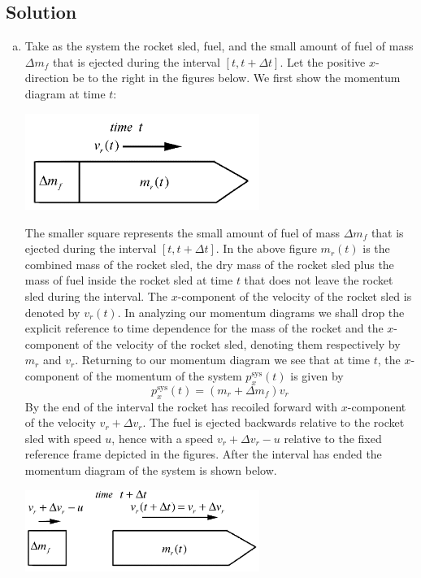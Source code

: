 \documentclass[solutions]{esg8012exam}
\begin{document}
\subsection{Solution}
  \begin{enumerate}[(a)]
    \item
      Take as the system the rocket sled, fuel, and the small amount of fuel of mass $\Delta m_f$ that is ejected during the interval $[t, t + \Delta t]$. Let the positive $x$-direction be to the right in the figures below. We first show the momentum diagram at time $t$:
      \begin{center}\includegraphics[width=0.6\textwidth]{exam2_s3_1}\end{center}
      The smaller square represents the small amount of fuel of mass $\Delta m_f$ that is ejected during the interval $[t,t+\Delta t]$. In the above figure $m_r (t)$ is the combined mass of the rocket sled, the dry mass of the rocket sled plus the mass of fuel inside the rocket sled at time $t$ that does not leave the rocket sled during the interval. The $x$-component of the velocity of the rocket sled is denoted by $v_r(t)$.  In analyzing our momentum diagrams we shall drop the explicit reference to time dependence for the mass of the rocket and the $x$-component of the velocity of the rocket sled, denoting them respectively by $m_r$ and $v_r $. Returning to our momentum diagram we see that at time $t$, the $x$-component of the momentum of the system $p_x^\text{sys}(t)$ is given by
      \begin{equation} p_x^\text{sys}(t)=(m_r +\Delta m_f) v_r  \label{eq:3:p_x^sys(t)} \end{equation}
      By the end of the interval the rocket has recoiled forward with $x$-component of the velocity $v_r +\Delta v_r $. The fuel is ejected backwards relative to the rocket sled with speed $u$, hence with a speed $v_r +\Delta v_r -u$ relative to the fixed reference frame depicted in the figures. After the interval has ended the momentum diagram of the system is shown below.
      \begin{center}\includegraphics[width=0.6\textwidth]{exam2_s3_2}\end{center}

\end{enumerate}
\end{document}
